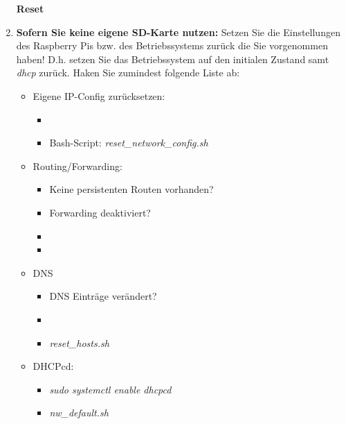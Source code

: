 \documentclass[paper=a4,fontsize=11pt]{scrartcl}%
\numberwithin{equation}{section}
\begin{document}
\begin{enumerate}
\begin{center}\Large{\textbf{Reset}}\end{center}\vskip0.25in
\item \textbf{Sofern Sie keine eigene SD-Karte nutzen:} Setzen Sie die Einstellungen des Raspberry Pis bzw. des Betriebssystems zurück die Sie vorgenommen haben! D.h. setzen Sie das Betriebssystem auf den initialen Zustand samt \emph{dhcp} zurück. Haken Sie zumindest folgende Liste ab:
\begin{itemize}
	\item Eigene IP-Config zurücksetzen:
	\begin{itemize}
		\item {}
		\item Bash-Script: \emph{reset\_network\_config.sh}
	\end{itemize}
	\item Routing/Forwarding:
	\begin{itemize}
		\item Keine persistenten Routen vorhanden?
		\item Forwarding deaktiviert? 
		\item {}
		\item {}
	\end{itemize}
	\item DNS
	\begin{itemize}
		\item DNS Einträge verändert?
		\item {}
		\item \emph{reset\_hosts.sh}
	\end{itemize}
	\item DHCPcd:
	\begin{itemize}
		\item \emph{sudo systemctl enable dhcpcd}
		\item \emph{nw\_default.sh}
	\end{itemize}
\end{itemize}
\end{enumerate}
\end{document}
